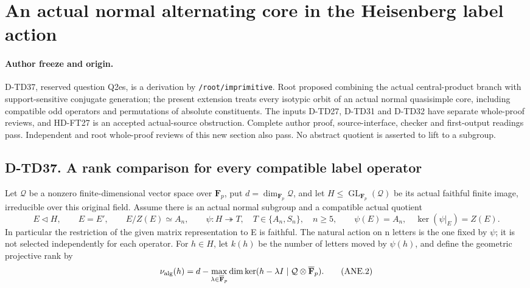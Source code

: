 \section{An actual normal alternating core in the Heisenberg label action}
\label{sec:heisenberg-normal-alternating-core}

\paragraph{Author freeze and origin.}
D-TD37, reserved question Q2es, is a derivation by
\texttt{/root/imprimitive}.  Root proposed combining the actual
central-product branch with support-sensitive conjugate generation;
the present extension treats every isotypic orbit of an actual normal
quasisimple core, including compatible odd operators and permutations
of absolute constituents.  The inputs D-TD27, D-TD31 and D-TD32
have separate whole-proof reviews, and HD-FT27 is an accepted
actual-source obstruction.  Complete author proof, source-interface,
checker and first-output readings pass.  Independent and root whole-proof
reviews of this new section also pass.  No abstract quotient is
asserted to lift to a subgroup.

\subsection*{D-TD37. A rank comparison for every compatible label operator}

Let \(\mathcal Q\) be a nonzero finite-dimensional vector space over
\(\mathbf F_p\), put \(d=\dim_{\mathbf F_p}\mathcal Q\), and let
\(H\le\operatorname{GL}_{\mathbf F_p}(\mathcal Q)\) be its actual
faithful finite image, irreducible over this original field.  Assume
there is an actual normal subgroup and a compatible actual quotient
\[
 E\triangleleft H,\qquad E=E',\qquad
 E/Z(E)\simeq A_n,\qquad
 \psi:H\twoheadrightarrow T,\quad T\in\{A_n,S_n\},\quad n\ge5,
 \qquad \psi(E)=A_n,\quad\ker(\psi|_E)=Z(E).
 \tag{ANE.1}
\]
In particular the restriction of the given matrix representation to E
is faithful.  The natural action on n letters is the one fixed by
\(\psi\); it is not selected independently for each operator.
For \(h\in H\), let \(k(h)\) be the number of letters moved by
\(\psi(h)\), and define the geometric projective rank by
\[
 \nu_{\rm alg}(h)
   =d-\max_{\lambda\in\overline{\mathbf F}_p}
          \dim\ker(h-\lambda I\mid\mathcal Q\otimes\overline{\mathbf F}_p).
 \tag{ANE.2}
\]

